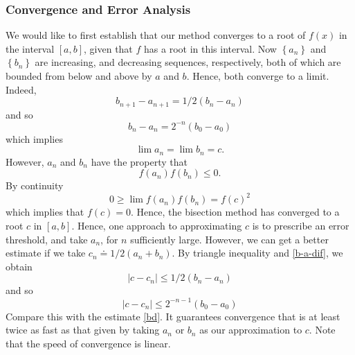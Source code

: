 \documentclass[12pt,reqno]{amsart}
\numberwithin{equation}{section}  %
\begin{document}
\subsubsection{Convergence and Error Analysis} 
We would like to first establish that our method converges to a root of
$f(x)$ in the interval $[a,b]$, given that $f$ has a root in this interval.
Now $ \left\{ a_n \right\} $ and $ \left\{ b_n \right\}  $ 
are increasing, and decreasing sequences, respectively, both of which
are bounded from below and above by $a$ and $b$. Hence, both converge
to a limit. Indeed,
\begin{equation}
\label{b-a-dif}
 b_{n+1} - a_{n+1} = 1/2(b_n - a_n)
\end{equation}
and so
\begin{equation}
\label{bd}
b_{n} - a_{n} = 2^{-n}(b_0 - a_0)
\end{equation}
which implies
\begin{equation*}
\lim a_n = \lim b_{n} = c.
\end{equation*}
However, $a_n$ and $b_n$ have the property that
\begin{equation*}
f(a_n)f(b_n) \le 0.
\end{equation*}
By continuity
\begin{equation*}
0 \ge \lim f(a_n)f(b_n) = f(c)^2
\end{equation*}
which implies that $f(c) = 0$. Hence, the bisection method has converged to a root
$c$ in $[a,b]$.
Hence, one approach to approximating $c$ is to prescribe an error threshold, and
take $a_n$, for $n$ sufficiently large. However, we can get a better estimate
if we take $c_n \doteq 1/2(a_n + b_n)$. By triangle inequality and \eqref{b-a-dif}, we obtain
\begin{equation*}
|c - c_n| \le 1/2 (b_n - a_n)
\end{equation*}
and so
\begin{equation*}
|c - c_n| \le 2^{-n - 1}(b_0 - a_0)
\end{equation*}
Compare this with the estimate \eqref{bd}. It guarantees convergence
that is at least twice as fast as that given by taking $a_n$ or $b_n$
as our approximation to $c$. Note that the speed of convergence is linear.
\end{document}
